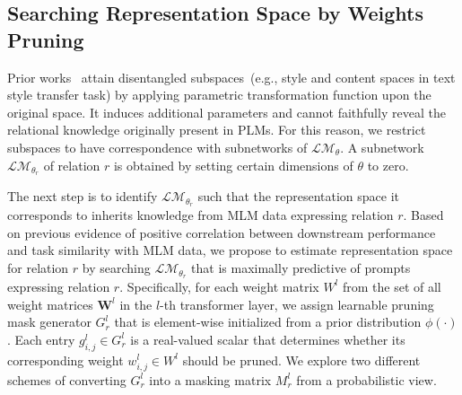 \label{sec:prompts}
\subsection{Searching Representation Space by Weights Pruning}
\label{sec:pruning}
Prior works~\citep{disen} attain disentangled subspaces~(e.g., style and content spaces in text style transfer task) by applying parametric transformation function upon the original space. It induces additional parameters and cannot faithfully reveal the relational knowledge originally present in PLMs. For this reason, we restrict subspaces to have correspondence with subnetworks of $\mathcal{LM}_{\theta}$. A subnetwork $\mathcal{LM}_{\theta_r}$ of relation $r$  is obtained by setting certain dimensions of $\theta$ to zero. 

The next step is  to identify $\mathcal{LM}_{\theta_r}$ such that the representation space it corresponds to inherits knowledge from MLM data expressing relation $r$. Based on previous evidence of positive correlation between downstream performance and task similarity with MLM data, we propose to estimate representation space for relation $r$ by searching $\mathcal{LM}_{\theta_r}$ 
that is maximally predictive of prompts expressing relation $r$. Specifically, for each weight matrix $W^l$ from the set of all weight matrices $\bm{W}^l$ in the $l$-th transformer layer, we assign 
learnable pruning mask generator $G_r^l$ 
that is element-wise initialized from a prior distribution $\phi(\cdot)$ .
Each entry $g_{i,j}^l\in G_r^l$ is a real-valued scalar that determines whether its corresponding weight $w_{i,j}^l\in W^l$ should be pruned. We explore two different schemes of converting $G_r^l$ into a masking matrix $M_r^l$ from a probabilistic view.

